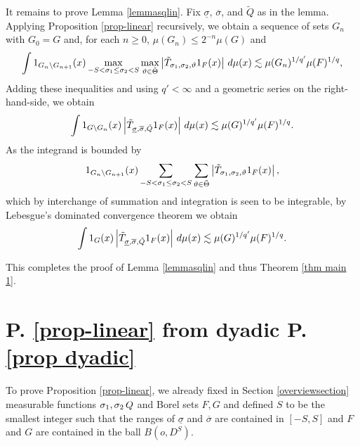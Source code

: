 It remains to prove Lemma \ref{lemmasqlin}.
Fix $\underline{\sigma}$, $\overline{\sigma}$,
and $\tilde{Q}$ as in  the lemma.
Applying Proposition \ref{prop-linear} recursively, we obtain
a sequence of sets $G_n$ with $G_0=G$ and,
for each $n\ge 0$, $\mu(G_{n})\le 2^{-n} \mu(G)$
 and
 \begin{equation}
    \int 1_{G_{n}\setminus G_{n+1}}(x)
\max_{-S<\sigma_1\le \sigma_2<S}\max_{\vartheta\in\tilde{\Theta}}
\left| \Tilde{T}_{\sigma_1,\sigma_2,\vartheta} 1_{F}(x) \right|\, d\mu(x)
\lesssim \mu(G_n)^{1/q'} \mu(F)^{1/q},
\end{equation}
Adding these inequalities and using $q'<\infty$ and
a geometric series on the right-hand-side, we obtain
    \begin{equation} \label{Sqcut2}
    \int 1_{G\setminus G_{n}}(x)
\left| \Tilde{T}_{\underline{\sigma},\overline{\sigma},\tilde{Q}}1_F(x) \right|\, d\mu(x)
\lesssim \mu(G)^{1/q'} \mu(F)^{1/q}.
\end{equation}
As the integrand is bounded by
\begin{equation}1_{G_{n}\setminus G_{n+1}}(x)
\sum_{-S<\sigma_1\le \sigma_2<S}\sum_{\vartheta\in\tilde{\Theta}}
\left| \Tilde{T}_{\sigma_1,\sigma_2,\vartheta} 1_{F}(x) \right|,
\end{equation}
which by interchange of summation and integration is seen to be integrable, by Lebesgue's dominated convergence theorem we obtain
 \begin{equation} \label{Sqcut3}
    \int 1_{G}(x)
\left| \Tilde{T}_{\underline{\sigma},\overline{\sigma},\tilde{Q}}1_F(x) \right|\, d\mu(x)
\lesssim \mu(G)^{1/q'} \mu(F)^{1/q}.
\end{equation}



This completes the proof of Lemma \ref{lemmasqlin}
and thus Theorem \ref{thm main 1}.

\chapter{P. \ref{prop-linear}
from dyadic P. \ref{prop dyadic}}
\label{christsection}

To prove Proposition
\ref{prop-linear}, we already fixed in Section \ref{overviewsection}
measurable functions ${\sigma_1},\sigma_2\,{Q}$ and Borel sets $F,G$
and defined $S$ to be the smallest
integer such that the ranges of
$\underline{\sigma}$ and $ \overline\sigma$ are contained in $[-S,S]$ and $F$ and $G$ are contained
in the ball $B(o, D^S)$.

